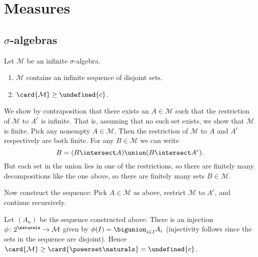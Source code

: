 \documentclass[article, a4paper, 11pt, oneside]{memoir}
\title{\doctitle}
\author{\docauthor}
\let\mathfrak\undefined
\numberwithin{equation}{chapter}
\newcommand{\calM}{\mathcal{M}}
\begin{document}
\maketitle

\chapter{Measures}

\addtocounter{section}{1}
\section[sigma-algebras][$\sigma$-algebras]{$\sigma$-algebras}

\begin{exerciseframed*}[1]
    Let $\calM$ be an infinite $\sigma$-algebra.
    \begin{enumerate}
        \item $\calM$ contains an infinite sequence of disjoint sets.
        \item $\card{\calM} \geq \mathfrak{c}$.
    \end{enumerate}
\end{exerciseframed*}

\begin{solution}
	\item We show by contraposition that there exists an $A \in \calM$ such that the restriction of $\calM$ to $A^c$ is infinite. That is, assuming that no such set exists, we show that $\calM$ is finite. Pick any nonempty $A \in \calM$. Then the restriction of $\calM$ to $A$ and $A^c$ respectively are both finite. For any $B \in \calM$ we can write
	\begin{equation*}
		B = (B \intersect A) \union (B \intersect A^c).
	\end{equation*}
	But each set in the union lies in one of the restrictions, so there are finitely many decompositions like the one above, so there are finitely many sets $B \in \calM$.
	
	Now construct the sequence: Pick $A \in \calM$ as above, restrict $\calM$ to $A^c$, and continue recursively.
	
	\item Let $(A_n)$ be the sequence constructed above. There is an injection $\phi\colon 2^\naturals \to \calM$ given by $\phi(I) = \bigunion_{i \in I} A_i$ (injectivity follows since the sets in the sequence are disjoint). Hence $\card{\calM} \geq \card{\powerset\naturals} = \mathfrak{c}$.
\end{solution}
\end{document}
